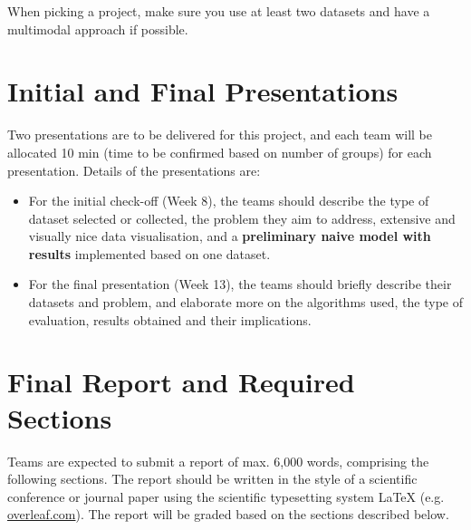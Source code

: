 \documentclass[DIV12, oneside]{scrartcl}
\begin{document}
When picking a project, make sure you use at least two datasets and have a multimodal approach if possible. 


\section{Initial and Final Presentations}
\label{sectPresentations}

Two presentations are to be delivered for this project, and each team will be allocated 10 min (time to be confirmed based on number of groups) for each presentation. Details of the presentations are:
\begin{itemize}
\item For the initial check-off (Week 8), the teams should describe the type of dataset selected or collected, the problem they aim to address, extensive and visually nice data visualisation, and a \textbf{preliminary naive model with results} implemented based on one dataset. 
\item For the final presentation (Week 13), the teams should briefly describe their datasets and problem, and elaborate more on the algorithms used, the type of evaluation, results obtained and their implications. \end{itemize}


\section{Final Report and Required Sections}
\label{sectReportFormat}

Teams are expected to submit a report of max. 6,000 words, comprising the following sections. The report should be written in the style of a scientific conference or journal paper using the scientific typesetting system LaTeX (e.g. \url{overleaf.com}). The report will be graded based on the sections described below. 
\end{document}
